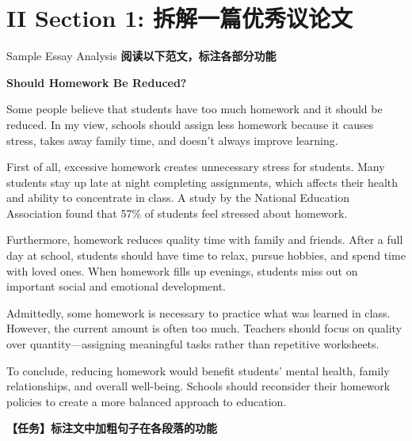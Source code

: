 \documentclass[12pt]{ctexart}
\begin{document}
\section*{II Section 1: 拆解一篇优秀议论文}

\begin{readingtask}{Sample Essay Analysis}
  \textbf{阅读以下范文，标注各部分功能}
  
  \begin{readingtext}
    
    {\large\textbf{Should Homework Be Reduced?}}
    
    Some people believe that students have too much homework and it should be reduced.  In my view, schools should assign less homework because it causes stress, takes away family time, and doesn't always improve learning.

    First of all, excessive homework creates unnecessary stress for students.  Many students stay up late at night completing assignments, which affects their health and ability to concentrate in class. A study by the National Education Association found that 57\% of students feel stressed about homework.

    Furthermore, homework reduces quality time with family and friends.  After a full day at school, students should have time to relax, pursue hobbies, and spend time with loved ones. When homework fills up evenings, students miss out on important social and emotional development.

    Admittedly, some homework is necessary to practice what was learned in class.  However, the current amount is often too much. Teachers should focus on quality over quantity—assigning meaningful tasks rather than repetitive worksheets.

    To conclude, reducing homework would benefit students' mental health, family relationships, and overall well-being.  Schools should reconsider their homework policies to create a more balanced approach to education.
  \end{readingtext}
  
  \textbf{【任务】标注文中加粗句子在各段落的功能}
  
  \begin{questions}
    \ansspace[8cm]
    

\end{questions}
\end{readingtask}
\end{document}
